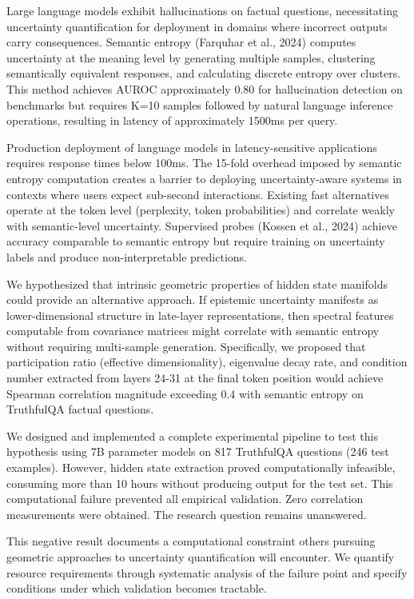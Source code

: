 
Large language models exhibit hallucinations on factual questions, necessitating uncertainty quantification for deployment in domains where incorrect outputs carry consequences. Semantic entropy (Farquhar et al., 2024) computes uncertainty at the meaning level by generating multiple samples, clustering semantically equivalent responses, and calculating discrete entropy over clusters. This method achieves AUROC approximately 0.80 for hallucination detection on benchmarks but requires K=10 samples followed by natural language inference operations, resulting in latency of approximately 1500ms per query.

Production deployment of language models in latency-sensitive applications requires response times below 100ms. The 15-fold overhead imposed by semantic entropy computation creates a barrier to deploying uncertainty-aware systems in contexts where users expect sub-second interactions. Existing fast alternatives operate at the token level (perplexity, token probabilities) and correlate weakly with semantic-level uncertainty. Supervised probes (Kossen et al., 2024) achieve accuracy comparable to semantic entropy but require training on uncertainty labels and produce non-interpretable predictions.

We hypothesized that intrinsic geometric properties of hidden state manifolds could provide an alternative approach. If epistemic uncertainty manifests as lower-dimensional structure in late-layer representations, then spectral features computable from covariance matrices might correlate with semantic entropy without requiring multi-sample generation. Specifically, we proposed that participation ratio (effective dimensionality), eigenvalue decay rate, and condition number extracted from layers 24-31 at the final token position would achieve Spearman correlation magnitude exceeding 0.4 with semantic entropy on TruthfulQA factual questions.

We designed and implemented a complete experimental pipeline to test this hypothesis using 7B parameter models on 817 TruthfulQA questions (246 test examples). However, hidden state extraction proved computationally infeasible, consuming more than 10 hours without producing output for the test set. This computational failure prevented all empirical validation. Zero correlation measurements were obtained. The research question remains unanswered.

This negative result documents a computational constraint others pursuing geometric approaches to uncertainty quantification will encounter. We quantify resource requirements through systematic analysis of the failure point and specify conditions under which validation becomes tractable.
